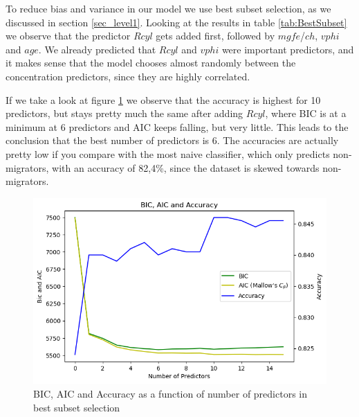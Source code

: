 To reduce bias and variance in our model we use best subset selection, as we discussed in section \ref{sec_level1}. Looking at the results in table \ref{tab:BestSubset} we observe that the predictor $Rcyl$ gets added first, followed by $mgfe$/$ch$, $vphi$ and $age$. We already predicted that $Rcyl$ and $vphi$ were important predictors, and it makes sense that the model chooses almost randomly between the concentration predictors, since they are highly correlated.


If we take a look at figure \ref{fig:BicAicAccuracy}
we observe that the accuracy is highest for 10 predictors, but stays pretty much the same after adding $Rcyl$, where BIC is  at a minimum at 6 predictors and AIC keeps falling, but very little. This leads to the conclusion that the best number of predictors is 6. The accuracies are actually pretty low if you compare with the most naive classifier, which only predicts non-migrators, with an accuracy of 82,4\%, since the dataset is skewed towards non-migrators.

\begin{figure}[h!]
    \centering
    \includegraphics[width=0.8\columnwidth]{Plots/BIC, AIC, ACC all 15.png}
    \caption{BIC, AIC and Accuracy as a function of number of predictors in best subset selection}
    \label{fig:BicAicAccuracy}
\end{figure}

